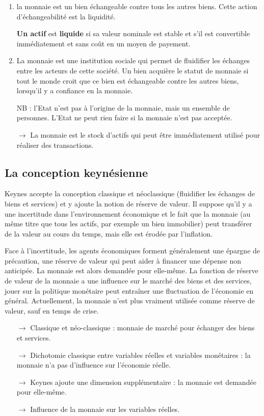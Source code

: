 	\begin{enumerate}
		\item la monnaie est un bien échangeable contre tous les autres biens. Cette action d'échangeabilité est la liquidité.
		
		\textbf{Un actif} est \textbf{liquide} si sa valeur nominale est stable et s'il est convertible immédiatement et sans coût en un moyen de payement.
		
		\item La monnaie est une institution sociale qui permet de fluidifier les échanges entre les acteurs de cette société. Un bien acquière le statut de monnaie si tout le monde croit que ce bien est échangeable contre les autres biens, lorsqu'il y a confiance en la monnaie.
		
		NB : l'Etat n'est pas à l'origine de la monnaie, mais un ensemble de personnes. L'Etat ne peut rien faire si la monnaie n'est pas acceptée.
		
		\item[$\rightarrow$] La monnaie est le stock d'actifs qui peut être immédiatement utilisé pour réaliser des transactions.
	\end{enumerate}
	
		
	\subsection{La conception keynésienne}
	
	Keynes accepte la conception classique et néoclassique (fluidifier les échanges de biens et services) et y ajoute  la notion de réserve de valeur. Il suppose qu'il y a une incertitude dans l'environnement économique et le fait que la monnaie (au même titre que tous les actifs, par exemple un bien immobilier) peut transférer de la valeur au cours du temps, mais elle est érodée par l'inflation. 
	
	Face à l'incertitude, les agents économiques forment généralement une épargne de précaution, une réserve de valeur qui peut aider à financer une dépense non anticipée. La monnaie est alors demandée pour elle-même. La fonction de réserve de valeur de la monnaie a une influence sur le marché des biens et des services, jouer sur la politique monétaire peut entraîner une fluctuation de l'économie en général. Actuellement, la monnaie n'est plus vraiment utilisée comme réserve de valeur, sauf en temps de crise.
	
	\begin{itemize}
		\item[$\rightarrow$] Classique et néo-classique : monnaie de marché pour échanger des biens et services.
		\item[$\rightarrow$] Dichotomie classique entre variables réelles et variables monétaires : la monnaie n'a pas d'influence sur l'économie réelle.
		\item[$\rightarrow$] Keynes ajoute une dimension supplémentaire : la monnaie est demandée pour elle-même.
		\item[$\rightarrow$] Influence de la monnaie sur les variables réelles.
	\end{itemize}

